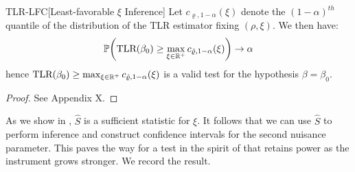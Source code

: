 \begin{propositionp}{TLR-LFC}[Least-favorable \(\xi\) Inference]
\label{prop:tlr-lfc}
Let \(c_{\varrho,1-\alpha}(\xi) \) denote the \((1-\alpha)^{th}\) {quantile} of the distribution of the TLR estimator fixing \((\rho,\xi)\).
  We then have:
\begin{align*}
    \mathbb{P}\!\left(\textrm{TLR}(\beta_0) \geq \max_{\xi \in \mathbb{R}^+} c_{\hat\varrho,1-\alpha}(\xi)\right) \to \alpha
\end{align*} 
hence \(\textrm{TLR}(\beta_0) \geq \max_{\xi \in \mathbb{R}^+} c_{\hat\varrho,1-\alpha}(\xi)\)  is a valid test for the hypothesis \(\beta=\beta_0\).
\end{propositionp}
\begin{proof}
    See Appendix X.
\end{proof}
\noindent 
As we show in , \(\hat S\) is a sufficient statistic for \(\xi\). It follows that we can use \(\hat S\) to perform inference and construct confidence intervals for the second nuisance parameter. This paves the way for a test in the spirit of \cite{bergerValuesMaximizedConfidence1994} that retains power as the instrument grows stronger.
We record the result.


